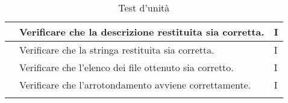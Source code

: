 \begin{center}
\begin{longtable}{ |C{3cm} | C{8.5cm}| C{1.5cm} |}
         & Verificare che la descrizione restituita sia corretta.                                                  & I \\\hline
         & Verificare che la stringa restituita sia corretta.                                                      & I \\\hline
         & Verificare che l'elenco dei file ottenuto sia corretto.                                                 & I \\\hline
         & Verificare che l'arrotondamento avviene correttamente.                                                  & I \\\hline
        \caption{Test d'unità}
    \end{longtable}
\end{center}
\setcounter{rowcount}{0}

